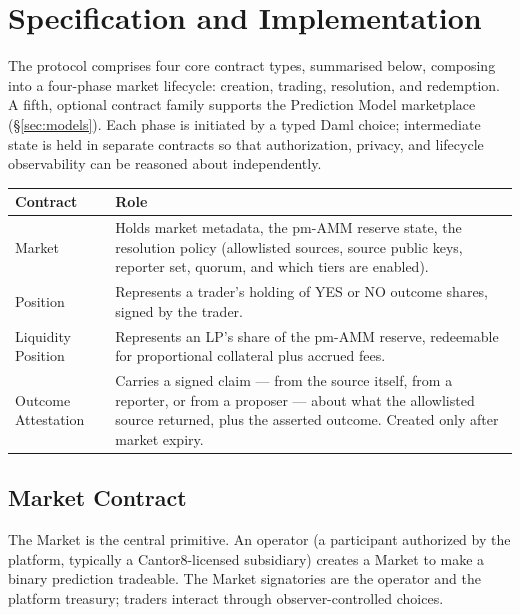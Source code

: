 \documentclass[11pt,a4paper]{article}
\begin{document}
\section{Specification and Implementation}

The protocol comprises four core contract types, summarised below, composing into a four-phase market lifecycle: creation, trading, resolution, and redemption. A fifth, optional contract family supports the Prediction Model marketplace (\S\ref{sec:models}). Each phase is initiated by a typed Daml choice; intermediate state is held in separate contracts so that authorization, privacy, and lifecycle observability can be reasoned about independently.

\vspace{0.4em}
\begin{center}
\begin{tabular}{p{4.5cm} p{9.5cm}}
\toprule
\textbf{Contract} & \textbf{Role} \\
\midrule
Market & Holds market metadata, the pm-AMM reserve state, the resolution policy (allowlisted sources, source public keys, reporter set, quorum, and which tiers are enabled). \\
Position & Represents a trader's holding of YES or NO outcome shares, signed by the trader. \\
Liquidity Position & Represents an LP's share of the pm-AMM reserve, redeemable for proportional collateral plus accrued fees. \\
Outcome Attestation & Carries a signed claim --- from the source itself, from a reporter, or from a proposer --- about what the allowlisted source returned, plus the asserted outcome. Created only after market expiry. \\
\bottomrule
\end{tabular}
\end{center}

\subsection{Market Contract}

The Market is the central primitive. An operator (a participant authorized by the platform, typically a Cantor8-licensed subsidiary) creates a Market to make a binary prediction tradeable. The Market signatories are the operator and the platform treasury; traders interact through observer-controlled choices.
\end{document}
